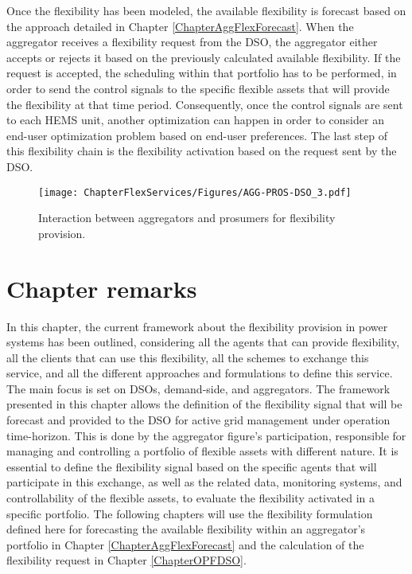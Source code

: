 Once the flexibility has been modeled, the available flexibility is forecast based on the approach detailed in Chapter \ref{ChapterAggFlexForecast}. When the aggregator receives a flexibility request from the DSO, the aggregator either accepts or rejects it based on the previously calculated available flexibility. If the request is accepted, the scheduling within that portfolio has to be performed, in order to send the control signals to the specific flexible assets that will provide the flexibility at that time period. Consequently, once the control signals are sent to each HEMS unit, another optimization can happen in order to consider an end-user optimization problem based on end-user preferences. The last step of this flexibility chain is the flexibility activation based on the request sent by the DSO.

\vspace*{8mm}

\begin{figure}[htbp]
	\centering
	\texttt{[image: ChapterFlexServices/Figures/AGG-PROS-DSO\_3.pdf]}
		\caption{Interaction between aggregators and prosumers for flexibility provision.}
	\label{fig:agg-pros-dso}  
\end{figure}

\newpage
\section{Chapter remarks}

In this chapter, the current framework about the flexibility provision in power systems has been outlined, considering all the agents that can provide flexibility, all the clients that can use this flexibility, all the schemes to exchange this service, and all the different approaches and formulations to define this service. The main focus is set on DSOs, demand-side, and aggregators. The framework presented in this chapter allows the definition of the flexibility signal that will be forecast and provided to the DSO for active grid management under operation time-horizon. This is done by the aggregator figure's participation, responsible for managing and controlling a portfolio of flexible assets with different nature. It is essential to define the flexibility signal based on the specific agents that will participate in this exchange, as well as the related data, monitoring systems, and controllability of the flexible assets, to evaluate the flexibility activated in a specific portfolio. The following chapters will use the flexibility formulation defined here for forecasting the available flexibility within an aggregator's portfolio in Chapter \ref{ChapterAggFlexForecast} and the calculation of the flexibility request in Chapter \ref{ChapterOPFDSO}. 



